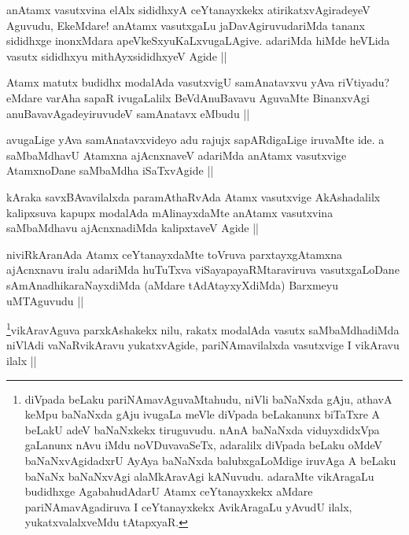 \begin{artha}
anAtamx vasutxvina elAlx sididhxyA ceYtanayxkekx atirikatxvAgiradeyeV Aguvudu, EkeMdare! anAtamx vasutxgaLu jaDavAgiruvudariMda tananx sididhxge inonxMdara apeVkeSxyuKaLxvugaLAgive. adariMda hiMde heVLida vasutx sididhxyu mithAyxsididhxyeV Agide ||
\end{artha}

\begin{artha}
Atamx matutx budidhx modalAda vasutxvigU samAnatavxvu yAva riVtiyadu? eMdare varAha sapaR ivugaLalilx BeVdAnuBavavu AguvaMte BinanxvAgi anuBavavAgadeyiruvudeV samAnatavx eMbudu ||
\end{artha}

\begin{artha}
avugaLige yAva samAnatavxvideyo adu rajujx sapARdigaLige iruvaMte ide. a saMbaMdhavU Atamxna ajAcnxnaveV  adariMda anAtamx vasutxvige AtamxnoDane saMbaMdha iSaTxvAgide ||
\end{artha}

\begin{artha}
kAraka savxBAvavilalxda paramAthaRvAda Atamx vasutxvige AkAshadalilx kalipxsuva kapupx modalAda mAlinayxdaMte anAtamx vasutxvina saMbaMdhavu ajAcnxnadiMda kalipxtaveV Agide ||
\end{artha}

\begin{artha}
niviRkAranAda Atamx ceYtanayxdaMte toVruva parxtayxgAtamxna ajAcnxnavu iralu adariMda huTuTxva viSayapayaRMtaraviruva vasutxgaLoDane sAmAnadhikaraNayxdiMda (aMdare tAdAtayxyXdiMda) Barxmeyu uMTAguvudu ||
\end{artha}

\begin{artha}
\footnote{diVpada beLaku pariNAmavAguvaMtahudu, niVli baNaNxda gAju, athavA keMpu baNaNxda gAju ivugaLa meVle diVpada beLakanunx biTaTxre A beLakU adeV baNaNxkekx tiruguvudu. nAnA baNaNxda viduyxdidxVpa gaLanunx nAvu iMdu noVDuvavaSeTx, adaralilx diVpada beLaku oMdeV baNaNxvAgidadxrU AyAya baNaNxda balubxgaLoMdige iruvAga A beLaku baNaNx baNaNxvAgi alaMkAravAgi kANuvudu. adaraMte vikAragaLu budidhxge AgabahudAdarU Atamx ceYtanayxkekx aMdare pariNAmavAgadiruva I ceYtanayxkekx AvikAragaLu yAvudU ilalx, yukatxvalalxveMdu tAtapxyaR.}vikAravAguva parxkAshakekx nilu, rakatx modalAda vasutx saMbaMdhadiMda niVlAdi vaNaRvikAravu yukatxvAgide, pariNAmavilalxda vasutxvige I vikAravu ilalx ||
\end{artha}

